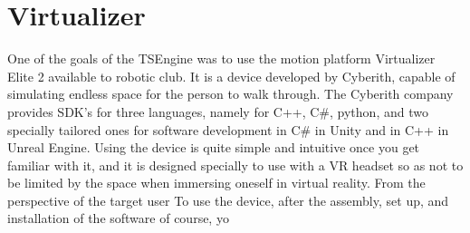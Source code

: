 \newpage
\section{Virtualizer}
\label{sec:virtualizer}
\hspace{\parindent}
One of the goals of the TSEngine was to use the motion platform Virtualizer Elite 2 available to robotic club. It is a device developed by Cyberith, capable of simulating endless space for the person to walk through. The Cyberith company provides SDK's for three languages, namely for C++, C\#, python, and two specially tailored ones for software development in C\# in Unity and in C++ in Unreal Engine. Using the device is quite simple and intuitive once you get familiar with it, and it is designed specially to use with a VR headset so as not to be limited by the space when immersing oneself in virtual reality. From the perspective of the target user 
To use the device, after the assembly, set up, and installation of the software of course, yo
